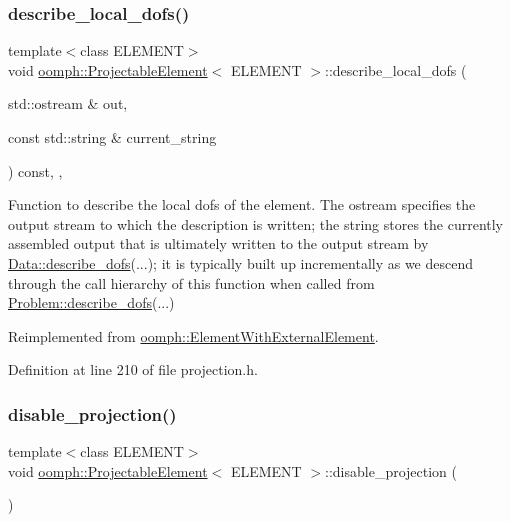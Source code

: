 \subsubsection{\texorpdfstring{describe\+\_\+local\+\_\+dofs()}{describe\_local\_dofs()}}
{\footnotesize\ttfamily template$<$class E\+L\+E\+M\+E\+NT$>$ \\
void \hyperlink{classoomph_1_1ProjectableElement}{oomph\+::\+Projectable\+Element}$<$ E\+L\+E\+M\+E\+NT $>$\+::describe\+\_\+local\+\_\+dofs (\begin{DoxyParamCaption}\item[{std\+::ostream \&}]{out,  }\item[{const std\+::string \&}]{current\+\_\+string }\end{DoxyParamCaption}) const\hspace{0.3cm}{\ttfamily [inline]}, {\ttfamily [protected]}, {\ttfamily [virtual]}}



Function to describe the local dofs of the element. The ostream specifies the output stream to which the description is written; the string stores the currently assembled output that is ultimately written to the output stream by \hyperlink{classoomph_1_1Data_a2dae16e2dcff9a40029f834c83364df5}{Data\+::describe\+\_\+dofs}(...); it is typically built up incrementally as we descend through the call hierarchy of this function when called from \hyperlink{classoomph_1_1Problem_abc103804eb319ae0b3d43870cc3e1eaf}{Problem\+::describe\+\_\+dofs}(...) 



Reimplemented from \hyperlink{classoomph_1_1ElementWithExternalElement_a2a1753bed2e822d399aa3525f1bdac4b}{oomph\+::\+Element\+With\+External\+Element}.



Definition at line 210 of file projection.\+h.

\mbox{\label{classoomph_1_1ProjectableElement_afd30334bf9f7cf2e9d210b7705bd8572}} 
\subsubsection{\texorpdfstring{disable\+\_\+projection()}{disable\_projection()}}
{\footnotesize\ttfamily template$<$class E\+L\+E\+M\+E\+NT$>$ \\
void \hyperlink{classoomph_1_1ProjectableElement}{oomph\+::\+Projectable\+Element}$<$ E\+L\+E\+M\+E\+NT $>$\+::disable\+\_\+projection (\begin{DoxyParamCaption}{ }\end{DoxyParamCaption})\hspace{0.3cm}{\ttfamily [inline]}}



